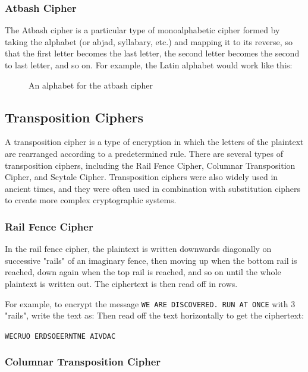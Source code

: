 \documentclass[11pt,a4paper]{report}
\begin{document}
\subsubsection{Atbash Cipher}

The Atbash cipher is a particular type of monoalphabetic cipher formed by taking the alphabet (or abjad, syllabary, etc.) and mapping it to its reverse, so that the first letter becomes the last letter, the second letter becomes the second to last letter, and so on.
For example, the Latin alphabet would work like this:

\begin{figure}[h]
\caption{An alphabet for the atbash cipher}
\end{figure}



\subsection{Transposition Ciphers}

A transposition cipher is a type of encryption in which the letters of the plaintext are rearranged according to a predetermined rule.
There are several types of transposition ciphers, including the Rail Fence Cipher, Columnar Transposition Cipher, and Scytale Cipher.
Transposition ciphers were also widely used in ancient times, and they were often used in combination with substitution ciphers to create more complex cryptographic systems.
\subsubsection{Rail Fence Cipher}

In the rail fence cipher, the plaintext is written downwards diagonally on successive "rails" of an imaginary fence, then moving up when the bottom rail is reached, down again when the top rail is reached, and so on until the whole plaintext is written out.
The ciphertext is then read off in rows.

For example, to encrypt the message \verb|WE ARE DISCOVERED. RUN AT ONCE|
with 3 "rails", write the text as:
Then read off the text horizontally to get the ciphertext:

\verb|WECRUO ERDSOEERNTNE AIVDAC|
\subsubsection{Columnar Transposition Cipher}
\end{document}
